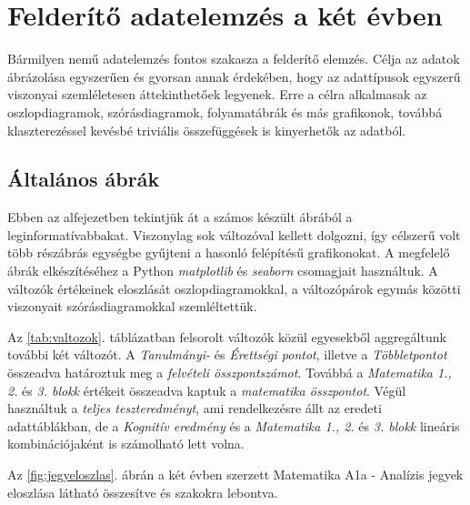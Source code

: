 \documentclass[12pt]{article}
\begin{document}
\newpage

\section{Felderítő adatelemzés a két évben}

Bármilyen nemű adatelemzés fontos szakasza a felderítő elemzés. Célja az adatok ábrázolása egyszerűen és gyorsan annak érdekében, hogy az adattípusok egyszerű viszonyai szemléletesen áttekinthetőek legyenek. Erre a célra alkalmasak az oszlopdiagramok, szórásdiagramok, folyamatábrák és más grafikonok, továbbá klaszterezéssel kevésbé triviális összefüggések is kinyerhetők az adatból.

\subsection{Általános ábrák}
\label{ssec:altalanos}

Ebben az alfejezetben tekintjük át a számos készült ábrából a leginformatívabbakat. Viszonylag sok változóval kellett dolgozni, így célszerű volt több részábrás egységbe gyűjteni a hasonló felépítésű grafikonokat. A megfelelő ábrák elkészítéséhez a Python \emph{matplotlib} és \emph{seaborn} csomagjait használtuk. A változók értékeinek eloszlását oszlopdiagramokkal, a változópárok egymás közötti viszonyait szórásdiagramokkal szemléltettük.

Az \ref{tab:valtozok}. táblázatban felsorolt változók közül egyesekből aggregáltunk további két változót. A \emph{Tanulmányi-} és \emph{Érettségi pontot}, illetve a \emph{Többletpontot} összeadva határoztuk meg a \emph{felvételi összpontszámot}. Továbbá a \emph{Matematika 1., 2.} és \emph{3. blokk} értékeit összeadva kaptuk a \emph{matematika összpontot}. Végül használtuk a \emph{teljes teszteredményt}, ami rendelkezésre állt az eredeti adattáblákban, de a \emph{Kognitív eredmény} és a \emph{Matematika 1., 2.} és \emph{3. blokk} lineáris kombinációjaként is számolható lett volna.



Az \ref{fig:jegyeloszlas}. ábrán a két évben szerzett Matematika A1a - Analízis jegyek eloszlása látható összesítve és szakokra lebontva. 
\end{document}
